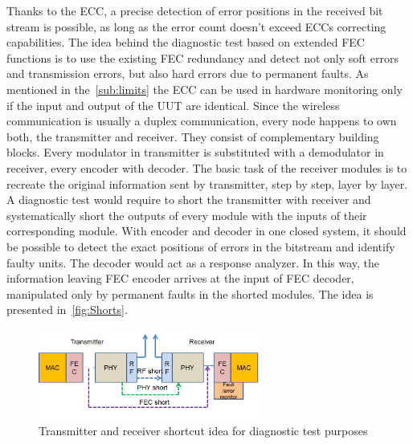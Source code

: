 Thanks to the ECC, a precise detection of error positions in the received bit stream is possible, as long as the error count doesn't exceed ECCs correcting capabilities. The idea behind the diagnostic test based on extended FEC functions is to use the existing FEC redundancy and detect not only soft errors and transmission errors, but also hard errors due to permanent faults. As mentioned in the~\autoref{sub:limits} the ECC can be used in hardware monitoring only if the input and output of the UUT are identical. Since the wireless communication is usually a duplex communication, every node happens to own both, the transmitter and receiver. They consist of complementary building blocks. Every modulator in transmitter is substituted with a demodulator in receiver, every encoder with decoder. The basic task of the receiver modules is to recreate the original information sent by transmitter, step by step, layer by layer. A diagnostic test would require to short the transmitter with receiver and systematically short the outputs of every module with the inputs of their corresponding module. With encoder and decoder in one closed system, it should be possible to detect the exact positions of errors in the bitstream and identify faulty units. The decoder would act as a response analyzer. In this way, the information leaving FEC encoder arrives at the input of FEC decoder, manipulated only by permanent faults in the shorted modules. The idea is presented in~\autoref{fig:Shorts}. 

\begin{figure}[h]
\centering
\includegraphics[width=0.65\textwidth]{figures/Shorts.png}
\caption{Transmitter and receiver shortcut idea for diagnostic test purposes}
\label{fig:Shorts}
\end{figure}

